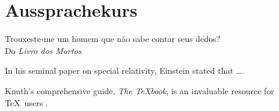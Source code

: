 
\chapter*{Aussprachekurs}

\begin{flushright}
{{\small {Trouxeste-me um homem que não sabe contar seus dedos?}\\
{Do \textit{Livro dos Mortos}}}}
\end{flushright}

In his seminal paper on special relativity, Einstein stated that \dots \cite{einstein1905}.

Knuth's comprehensive guide, \textit{The TeXbook}, is an invaluable resource for \TeX\ users \cite{knuth1984}.

\lipsum[1-25]